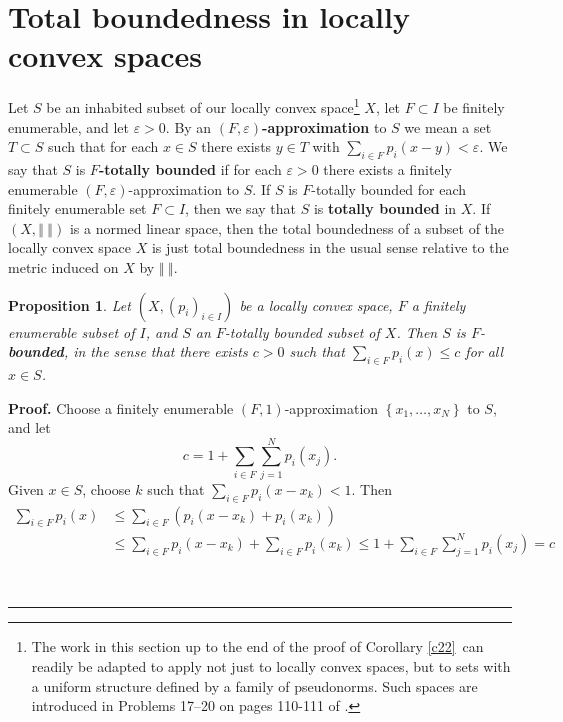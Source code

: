 \documentclass{article}%
\newtheorem{proposition}[theorem]{Proposition}
\newenvironment{proof}[1][Proof]{\noindent\textbf{#1.} }{\ \rule{0.5em}{0.5em}}
\begin{document}
\section{Total boundedness in locally convex spaces}

Let $S$ be an inhabited subset of our locally convex space\footnote{%
\normalfont\sf
The work in this section up to the end of the proof of Corollary \ref{c22}~can
readily be adapted to apply not just to locally convex spaces, but to sets
with a uniform structure defined by a family of pseudonorms. Such spaces are
introduced in Problems 17--20 on pages 110-111 of \cite{Bishop}.} $X$, let
$F\subset I$ be finitely enumerable, and let $\varepsilon>0$. By an $\left(
F,\varepsilon\right)  $\textbf{-approximation} to $S$ we mean a set $T\subset
S$ such that for each $x\in S$ there exists $y\in T$ with $\sum_{i\in F}%
p_{i}(x-y)<\varepsilon$. We say that $S$ is $F$\textbf{-totally bounded} if
for each $\varepsilon>0$ there exists a finitely enumerable $\left(
F,\varepsilon\right)  $-approximation to $S$. If $S$ is $F $-totally bounded
for each finitely enumerable set $F\subset I$, then we say that $S$ is
\textbf{totally bounded }in $X$. If $\left(  X,\left\Vert \ \right\Vert
\right)  $ is a normed linear space, then the total boundedness of a subset of
the locally convex space $X$ is just total boundedness in the usual sense
relative to the metric induced on $X$ by $\left\Vert \ \right\Vert $.

\begin{proposition}
\label{feb02p1}Let $\left(  X,\left(  p_{i}\right)  _{i\in I}\right)  $ be a
locally convex space, $F$ a finitely enumerable subset of $I$, and $S$ an
$F$-totally bounded subset of $X$. Then $S$ is $F$-\textbf{bounded}, in the
sense that there exists $c>0$ such that $\sum_{i\in F}p_{i}(x)\leq c$ for all
$x\in S$.
\end{proposition}

\begin{proof}
Choose a finitely enumerable $\left(  F,1\right)  $-approximation $\left\{
x_{1},\ldots,x_{N}\right\}  $ to $S$, and let%
\[
c=1+\sum_{i\in F}\sum_{j=1}^{N}p_{i}(x_{j}).
\]
Given $x\in S$, choose $k$ such that $\sum_{i\in F}p_{i}(x-x_{k})<1$. Then
\begin{align*}
\sum_{i\in F}p_{i}(x) &  \leq\sum_{i\in F}(p_{i}(x-x_{k})+p_{i}(x_{k}))\\
&  \leq\sum_{i\in F}p_{i}(x-x_{k})+\sum_{i\in F}p_{i}(x_{k})\leq1+\sum_{i\in
F}\sum_{j=1}^{N}p_{i}(x_{j})=c
\end{align*}
%

\hfill

\end{proof}
\end{document}
